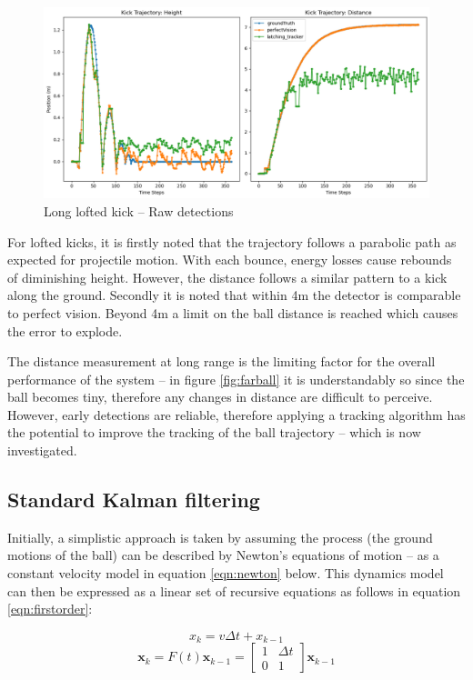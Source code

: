 \documentclass[a4paper,twoside,12pt]{report}
\begin{document}
\begin{figure}[h!]
\begin{center}
\includegraphics[width=14cm]{images/raw_loft_long.png}
\caption{Long lofted kick -- Raw detections}
\label{fig:rawloftlong}
\end{center}
\end{figure}

For lofted kicks, it is firstly noted that the trajectory follows a parabolic path as expected for projectile motion. With each bounce, energy losses cause rebounds of diminishing height. However, the distance follows a similar pattern to a kick along the ground. Secondly it is noted that within 4m the detector is comparable to perfect vision. Beyond 4m a limit on the ball distance is reached which causes the error to explode. 

The distance measurement at long range is the limiting factor for the overall performance of the system -- in figure \ref{fig:farball} it is understandably so since the ball becomes tiny, therefore any changes in distance are difficult to perceive. However, early detections are reliable, therefore applying a tracking algorithm has the potential to improve the tracking of the ball trajectory -- which is now investigated.

\subsection{Standard Kalman filtering}

Initially, a simplistic approach is taken by assuming the process (the ground motions of the ball) can be described by Newton's equations of motion -- as a constant velocity model in equation \ref{eqn:newton} below. This dynamics model can then be expressed as a linear set of recursive equations as follows in equation \ref{eqn:firstorder}:

\begin{equation} 
x_k=v\Delta t + x_{k-1}
\label{eqn:newton}
\end{equation}
\begin{equation} 
\boldsymbol{x}_k
=
F(t)\boldsymbol{x}_{k-1}
=
\begin{bmatrix}
    1 & \Delta t \\
    0 & 1 
\end{bmatrix}
\boldsymbol{x}_{k-1}
\label{eqn:firstorder}
\end{equation}
\end{document}
